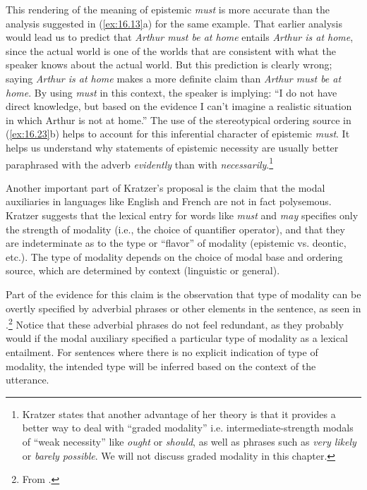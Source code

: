 This rendering of the meaning of epistemic \textit{must} is more accurate than the analysis suggested in (\ref{ex:16.13}a) for the same example. That earlier analysis would lead us to predict that \textit{Arthur must be at home} entails \textit{Arthur is at home}, since the actual world is one of the worlds that are consistent with what the speaker knows about the actual world. But this prediction is clearly wrong; saying \textit{Arthur is at home} makes a more definite claim than \textit{Arthur must be at home}. By using \textit{must} in this context, the speaker is implying: “I do not have direct knowledge, but based on the evidence I can’t imagine a realistic situation in which Arthur is not at home.” The use of the stereotypical ordering source in (\ref{ex:16.23}b) helps to account for this inferential character of epistemic \textit{must}. It helps us understand why statements of epistemic necessity are usually better paraphrased with the adverb \textit{evidently} than with \textit{necessarily}.\footnote{Kratzer states that another advantage of her theory is that it provides a better way to deal with “graded modality” i.e. intermediate-strength modals of “weak necessity” like \textit{ought} or \textit{should}, as well as phrases such as \textit{very likely} or \textit{barely possible}. We will not discuss graded modality in this chapter.}



Another important part of Kratzer’s proposal is the claim that the modal auxiliaries in languages like English and French are not in fact polysemous. Kratzer suggests that the lexical entry for words like \textit{must} and \textit{may} specifies only the strength of modality (i.e., the choice of quantifier operator), and that they are indeterminate as to the type or “flavor” of modality (epistemic vs. deontic, etc.). The type of modality depends on the choice of modal base and ordering source, which are determined by context (linguistic or general).



Part of the evidence for this claim is the observation that type of modality can be overtly specified by adverbial phrases or other elements in the sentence, as seen in .\footnote{From \citet{Hacquard2011}.} Notice that these adverbial phrases do not feel redundant, as they probably would if the modal auxiliary specified a particular type of modality as a lexical entailment. For sentences where there is no explicit indication of type of modality, the intended type will be inferred based on the context of the utterance.


